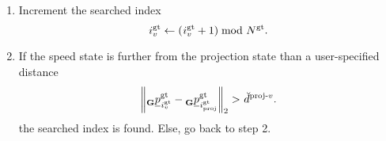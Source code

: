 \begin{itemize}
\begin{enumerate}
        \item Increment the searched index
        \begin{equation}
            \idx[]{\glotraj}{v}{}{} \leftarrow (\idx[]{\glotraj}{v}{}{} + 1) \bmod \num[]{\glotraj}{}{}{}.
        \end{equation}
        \item If the speed state is further 
        from the projection state than a user-specified distance
        \begin{equation}
            \left\| 
                \pos[]{\glotraj}{\idx[]{\glotraj}{v}{}{}}{\grs}{}
                - 
                \pos[]{\glotraj}{\idx[]{\glotraj}{\proj}{}{}}{\grs}{}
            \right\|_2
            > 
            \dist[\user]{\projtospeed}{}{}{}
            .
        \end{equation}
        the searched index is found.
        Else, go back to step 2.
    \end{enumerate}



\end{itemize}
